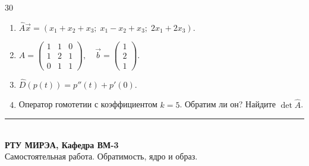 \documentclass[12pt,a4paper]{article}
\theoremstyle{plain}
\theoremstyle{definition}
\begin{document}
\begin{taskbox}{30}
    \begin{enumerate}
        \item $\hat{A}\vec{x} = (x_1 + x_2 + x_3; \; x_1 - x_2 + x_3; \; 2x_1 + 2x_3)$.
        \item $A = \begin{pmatrix} 1 & 1 & 0 \\ 1 & 2 & 1 \\ 0 & 1 & 1 \end{pmatrix}, \quad \vec{b} = \begin{pmatrix} 1 \\ 2 \\ 1 \end{pmatrix}$.
        \item $\hat{D}(p(t)) = p''(t) + p'(0)$.
        \item Оператор гомотетии с коэффициентом $k=5$. Обратим ли он? Найдите $\det \hat{A}$.
    \end{enumerate}
\end{taskbox}

\vspace{0.5cm}
\begin{center}
    \textcolor{mireaMain}{\rule{0.6\textwidth}{1pt}} \\
    \small \textbf{РТУ МИРЭА, Кафедра ВМ-3} \\
    \small Самостоятельная работа. Обратимость, ядро и образ.
\end{center}
\end{document}

